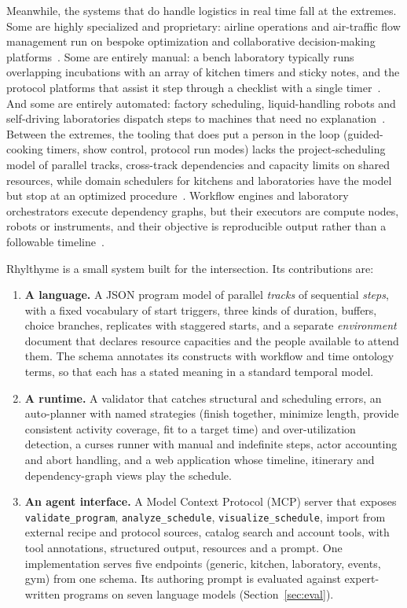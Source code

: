 \documentclass[10pt]{article}
\newcommand{\rt}{Rhylthyme}
\newcommand{\code}[1]{\texttt{#1}}
\begin{document}
Meanwhile, the systems that do handle logistics in real time fall at the extremes. Some are highly specialized and proprietary: airline operations and air-traffic flow management run on bespoke optimization and collaborative decision-making platforms~\cite{bertsimas1998atfm,wambsganss1996cdm}. Some are entirely manual: a bench laboratory typically runs overlapping incubations with an array of kitchen timers and sticky notes, and the protocol platforms that assist it step through a checklist with a single timer~\cite{teytelman2016protocolsio}. And some are entirely automated: factory scheduling, liquid-handling robots and self-driving laboratories dispatch steps to machines that need no explanation~\cite{wierenga2023pylabrobot,opentronsapi,tom2024sdl}. Between the extremes, the tooling that does put a person in the loop (guided-cooking timers, show control, protocol run modes) lacks the project-scheduling model of parallel tracks, cross-track dependencies and capacity limits on shared resources, while domain schedulers for kitchens and laboratories have the model but stop at an optimized procedure~\cite{matsushima2015cooking,nakabe2021cooking,zhou2026sdlscheduling}. Workflow engines and laboratory orchestrators execute dependency graphs, but their executors are compute nodes, robots or instruments, and their objective is reproducible output rather than a followable timeline~\cite{leipzig2017pipelines,tom2024sdl}.

\rt{} is a small system built for the intersection. Its contributions are:

\begin{enumerate}
  \item \textbf{A language.} A JSON program model of parallel \emph{tracks} of sequential \emph{steps}, with a fixed vocabulary of start triggers, three kinds of duration, buffers, choice branches, replicates with staggered starts, and a separate \emph{environment} document that declares resource capacities and the people available to attend them. The schema annotates its constructs with workflow and time ontology terms, so that each has a stated meaning in a standard temporal model.
  \item \textbf{A runtime.} A validator that catches structural and scheduling errors, an auto-planner with named strategies (finish together, minimize length, provide consistent activity coverage, fit to a target time) and over-utilization detection, a curses runner with manual and indefinite steps, actor accounting and abort handling, and a web application whose timeline, itinerary and dependency-graph views play the schedule.
  \item \textbf{An agent interface.} A Model Context Protocol (MCP) server that exposes \code{validate\_program}, \code{analyze\_schedule}, \code{visualize\_schedule}, import from external recipe and protocol sources, catalog search and account tools, with tool annotations, structured output, resources and a prompt. One implementation serves five endpoints (generic, kitchen, laboratory, events, gym) from one schema. Its authoring prompt is evaluated against expert-written programs on seven language models (Section~\ref{sec:eval}).
\end{enumerate}
\end{document}
